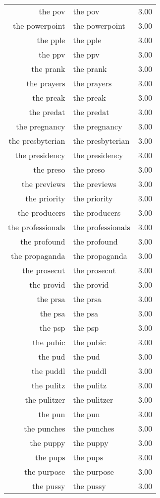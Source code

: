\begin{table}[ht]
\begin{tabular}{rlr}
  the pov & the pov & 3.00 \\ 
  the powerpoint & the powerpoint & 3.00 \\ 
  the pple & the pple & 3.00 \\ 
  the ppv & the ppv & 3.00 \\ 
  the prank & the prank & 3.00 \\ 
  the prayers & the prayers & 3.00 \\ 
  the preak & the preak & 3.00 \\ 
  the predat & the predat & 3.00 \\ 
  the pregnancy & the pregnancy & 3.00 \\ 
  the presbyterian & the presbyterian & 3.00 \\ 
  the presidency & the presidency & 3.00 \\ 
  the preso & the preso & 3.00 \\ 
  the previews & the previews & 3.00 \\ 
  the priority & the priority & 3.00 \\ 
  the producers & the producers & 3.00 \\ 
  the professionals & the professionals & 3.00 \\ 
  the profound & the profound & 3.00 \\ 
  the propaganda & the propaganda & 3.00 \\ 
  the prosecut & the prosecut & 3.00 \\ 
  the provid & the provid & 3.00 \\ 
  the prsa & the prsa & 3.00 \\ 
  the psa & the psa & 3.00 \\ 
  the psp & the psp & 3.00 \\ 
  the pubic & the pubic & 3.00 \\ 
  the pud & the pud & 3.00 \\ 
  the puddl & the puddl & 3.00 \\ 
  the pulitz & the pulitz & 3.00 \\ 
  the pulitzer & the pulitzer & 3.00 \\ 
  the pun & the pun & 3.00 \\ 
  the punches & the punches & 3.00 \\ 
  the puppy & the puppy & 3.00 \\ 
  the pups & the pups & 3.00 \\ 
  the purpose & the purpose & 3.00 \\ 
  the pussy & the pussy & 3.00 \\ 

\end{tabular}
\end{table}
